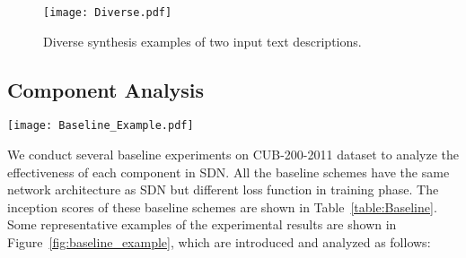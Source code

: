 \documentclass[sigconf]{acmart}
\begin{document}
\begin{figure}[!htb]
	\begin{center}
		\texttt{[image: Diverse.pdf]}
	\end{center}
	\caption{Diverse synthesis examples of two input text descriptions.}
	\label{fig:diverse}
\end{figure} 

\subsection{Component Analysis}

\begin{figure*}
	\begin{center}
		\texttt{[image: Baseline\_Example.pdf]}
	\end{center}
	\caption{Example results by our proposed SDN and the baselines on the CUB-200-2011 testing set.}
	\label{fig:baseline_example}
\end{figure*}

We conduct several baseline experiments on CUB-200-2011 dataset to analyze the effectiveness of each component in SDN. All the baseline schemes have the same network architecture as SDN but different loss function in training phase. The inception scores of these baseline schemes are shown in Table~\ref{table:Baseline}. Some representative examples of the experimental results are shown in Figure~\ref{fig:baseline_example}, which are introduced and analyzed as follows:
\end{document}
